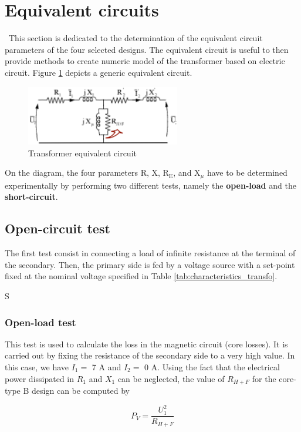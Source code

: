 \documentclass[12pt,a4paper]{report}
\begin{document}
\section{Equivalent circuits}
\quad\, This section is dedicated to the determination of the equivalent circuit parameters of the four selected designs. The equivalent circuit is useful to then provide methods to create numeric model of the transformer based on electric circuit. Figure \ref{fig:equivalent_circuit} depicts a generic equivalent circuit.

 \begin{figure}[h]
    \centering
    \includegraphics[width=0.6\textwidth]{equivalent_circuit.PNG}
    \caption{Transformer equivalent circuit}
    \label{fig:equivalent_circuit}
\end{figure}

On the diagram, the four parameters R, X, R$_\text{E}$, and X$_\mu$ have to be determined experimentally by performing two different tests, namely the \textbf{open-load} and the \textbf{short-circuit}. 

\subsection{Open-circuit test}
The first test consist in connecting a load of infinite resistance at the terminal of the secondary. Then, the primary side is fed by a voltage source with a set-point fixed at the nominal voltage specified in Table \ref{tab:characteristics_transfo}. 

S 
\subsubsection{Open-load test}
This test is used to calculate the loss in the magnetic circuit (core losses). It is carried out by fixing the resistance of the secondary side to a very high value. In this case, we have $I_1 =$ 7 A and $I_2 =$ 0 A. Using the fact that the electrical power dissipated in $R_1$ and $X_1$ can be neglected, the value of $R_{H+F}$ for the core-type B design can be computed by

\begin{equation}
   P_V = \frac{U_1^2}{R_{H+F}}
\end{equation}
\end{document}
